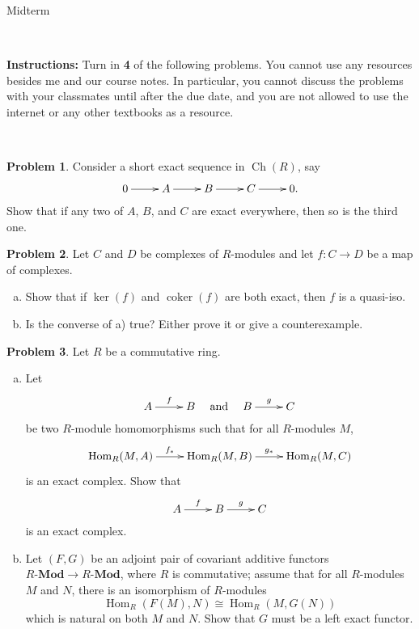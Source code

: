 \documentclass[11pt]{article}
\title{}
\date{\vspace{-0.5in}}
\DeclareMathOperator{\Hom}{Hom}
\DeclareMathOperator{\coker}{coker}
\DeclareMathOperator{\Ch}{Ch}
\newcommand{\Rmod}{R\textbf{-Mod}}
\theoremstyle{definition}
\newtheorem{problem}{Problem}
\begin{document}
\thispagestyle{fancy}
\pagestyle{fancy}

\vspace{2em}

\begin{center}
	{\LARGE Midterm}
\end{center}

\


\noindent
{\bf Instructions:}
Turn in {\bf 4} of the following problems. 
You cannot use any resources besides me and our course notes.
In particular, you cannot discuss the problems with your classmates until after the due date, and you are not allowed to use the internet or any other textbooks as a resource.


\





\begin{problem}
	Consider a short exact sequence in $\Ch(R)$, say
	$$\xymatrix{0 \ar[r] & A \ar[r] & B \ar[r] & C \ar[r] & 0.}$$
	Show that if any two of $A$, $B$, and $C$ are exact everywhere, then so is the third one.
\end{problem}

\vfill


\begin{problem}
	Let $C$ and $D$ be complexes of $R$-modules and let $f\!: C \to D$ be a map of complexes. 
	\begin{enumerate}[a)]
		\item Show that if $\ker(f)$ and $\coker(f)$ are both exact, then $f$ is a quasi-iso.
		\item Is the converse of a) true? Either prove it or give a counterexample.
	\end{enumerate}
\end{problem}


\vfill


\begin{problem} Let $R$ be a commutative ring.
\begin{enumerate}[a)]
	\item Let 
	$$\xymatrix{A \ar[r]^-f & B} \quad \textrm{and} \quad \xymatrix{B \ar[r]^-g & C}$$
	be two $R$-module homomorphisms such that for all $R$-modules $M$, 
	$$\xymatrix{\Hom_R(M,A) \ar[r]^-{f_*} & \Hom_R(M,B) \ar[r]^-{g_*} & \Hom_R(M,C)}$$
	is an exact complex. Show that
	$$\xymatrix{A \ar[r]^-f & B \ar[r]^-g & C}$$
	is an exact complex.
	\item Let $(F,G)$ be an adjoint pair of covariant additive functors $\Rmod \to \Rmod$, where $R$ is commutative; assume that for all $R$-modules $M$ and $N$, there is an isomorphism of $R$-modules	
	$$\Hom_R(F(M),N) \cong \Hom_R(M,G(N))$$
	which is natural on both $M$ and $N$. Show that $G$ must be a left exact functor.
\end{enumerate}
\end{problem}
\end{document}
